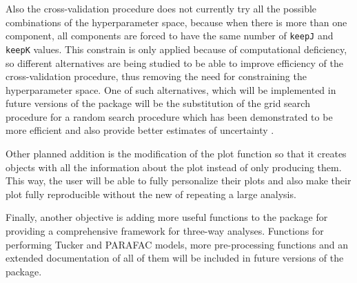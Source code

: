 Also the cross-validation procedure does not currently try all the possible combinations of the hyperparameter space, because when there is more than one component, all components are forced to have the same number of \texttt{keepJ} and \texttt{keepK} values. This constrain is only applied because of computational deficiency, so different alternatives are being studied to be able to improve efficiency of the cross-validation procedure, thus removing the need for constraining the hyperparameter space. One of such alternatives, which will be implemented in future versions of the package will be the substitution of the grid search procedure for a random search procedure which has been demonstrated to be more efficient and also provide better estimates of uncertainty \parencite{bergstra2012random}. 

Other planned addition is the modification of the plot function so that it creates objects with all the information about the plot instead of only producing them. This way, the user will be able to fully personalize their plots and also make their plot fully reproducible without the new of repeating a large analysis.

Finally, another objective is adding more useful functions to the package for providing a comprehensive framework for three-way analyses. Functions for performing Tucker and PARAFAC models, more pre-processing functions and an extended documentation of all of them will be included in future versions of the package.
